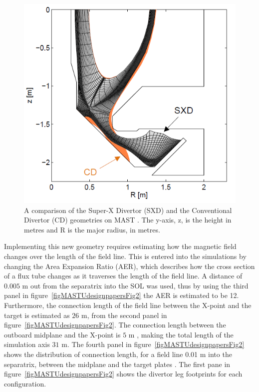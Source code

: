 \documentclass[12pt]{article}  %
\begin{document}
\begin{figure}[h]
\includegraphics[scale=0.5]{Figures/CDvsSXD.png}
\centering
\caption{A comparison of the Super-X Divertor (SXD) and the Conventional Divertor (CD) geometries on MAST \cite{Havlickova2014}. The y-axis, z, is the height in metres and R is the major radius, in metres.}\label{figCDvsSXD}
\end{figure}

Implementing this new geometry requires estimating how the magnetic field changes over the length of the field line. This is entered into the simulations by changing the Area Expansion Ratio (AER), which describes how the cross section of a flux tube changes as it traverses the length of the field line. A distance of $0.005$ m out from the separatrix into the SOL was used, thus by using the third panel in figure~\ref{figMASTUdesignpapersFig2} the AER is estimated to be 12. Furthermore, the connection length of the field line between the X-point and the target is estimated as $26$ m, from the second panel in figure~\ref{figMASTUdesignpapersFig2}. The connection length between the outboard midplane and the X-point is $5$ m \cite{Fishpool2013}, making the total length of the simulation axis $31$ m. The fourth panel in figure~\ref{figMASTUdesignpapersFig2} shows the distribution of connection length, for a field line 0.01 m into the separatrix, between the midplane and the target plates \cite{Fishpool2013}. The first pane in figure~\ref{figMASTUdesignpapersFig2} shows the divertor leg footprints for each configuration.
\end{document}
